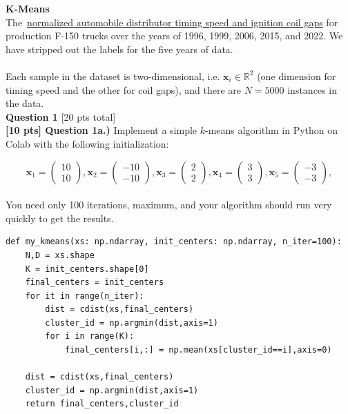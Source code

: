 \documentclass[paper=a4, fontsize=11pt]{scrartcl} %
\author{
    \textbf{YOUR NAME} \\ 
    \textbf{YOUR GIT USERNAME} \\ 
    \textbf{YOUR E-MAIL}
}%
\begin{document}
\maketitle %

{\huge \textbf{K-Means}} \\

The~\href{https://course.ccs.neu.edu/cs6220/homework-4/data/}{normalized automobile distributor timing speed and ignition coil gaps} for production F-150 trucks over the years of 1996, 1999, 2006, 2015, and 2022. We have stripped out the labels for the five years of data.\\
\\
Each sample in the dataset is two-dimensional, i.e. $\textbf{x}_i \in \mathbb{R}^2$ (one dimension for timing speed and the other for coil gaps), and there are $N=5000$ instances in the data.
\\

{\Large \textbf{Question 1} [20 pts total]} \\

\textbf{[10 pts] Question 1a.)} Implement a simple $k$-means algorithm in Python on Colab with the following initialization:

\begin{equation}
\textbf{x}_1 = \left( \begin{matrix} 10 \\ 10 \end{matrix} \right), \textbf{x}_2 = \left( \begin{matrix} -10 \\ -10 \end{matrix} \right),
\textbf{x}_3 = \left( \begin{matrix} 2 \\ 2 \end{matrix} \right),
\textbf{x}_4 = \left( \begin{matrix} 3 \\ 3 \end{matrix} \right),
\textbf{x}_5 = \left( \begin{matrix} -3 \\ -3 \end{matrix} \right),
\nonumber
\end{equation} \\

You need only 100 iterations, maximum, and your algorithm should run very quickly to get the results. \\
\begin{verbatim}
def my_kmeans(xs: np.ndarray, init_centers: np.ndarray, n_iter=100):
    N,D = xs.shape
    K = init_centers.shape[0]
    final_centers = init_centers
    for it in range(n_iter):
        dist = cdist(xs,final_centers)
        cluster_id = np.argmin(dist,axis=1)
        for i in range(K):
            final_centers[i,:] = np.mean(xs[cluster_id==i],axis=0)    
            
    dist = cdist(xs,final_centers)
    cluster_id = np.argmin(dist,axis=1)
    return final_centers,cluster_id
\end{verbatim}
\end{document}
